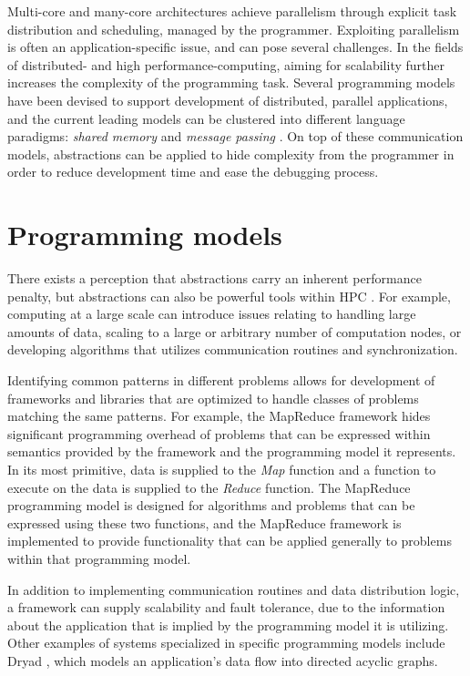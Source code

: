 \documentclass{uit-report}
\begin{document}
Multi-core and many-core architectures achieve parallelism through explicit task distribution and scheduling, managed by the programmer. Exploiting parallelism is often an application-specific issue, and can pose several challenges. In the fields of distributed- and high performance-computing, aiming for scalability further increases the complexity of the programming task. Several programming models have been devised to support development of distributed, parallel applications, and the current leading models can be clustered into different language paradigms: \emph{shared memory }and \emph{message passing} \cite{pgas_languages}. On top of these communication models, abstractions can be applied to hide complexity from the programmer in order to reduce development time and ease the debugging process. 

\section{Programming models}

There exists a perception that abstractions carry an inherent performance penalty, but abstractions can also be powerful tools within HPC \cite{mccandless_lumsdaine_1997}. For example, computing at a large scale can introduce issues relating to handling large amounts of data, scaling to a large or arbitrary number of computation nodes, or developing algorithms that utilizes communication routines and synchronization.

Identifying common patterns in different problems allows for development of frameworks and libraries that are optimized to handle classes of problems matching the same patterns. For example, the MapReduce framework hides significant programming overhead of problems that can be expressed within semantics provided by the framework and the programming model it represents. In its most primitive, data is supplied to the \emph{Map} function and a function to execute on the data is supplied to the \emph{Reduce} function. The MapReduce programming model is designed for algorithms and problems that can be expressed using these two functions, and the MapReduce framework is implemented to provide functionality that can be applied generally to problems within that programming model.

In addition to implementing communication routines and data distribution logic, a framework can supply scalability and fault tolerance, due to the information about the application that is implied by the programming model it is utilizing. Other examples of systems specialized in specific programming models include Dryad \cite{dryad}, which models an application's data flow into directed acyclic graphs.
\end{document}
